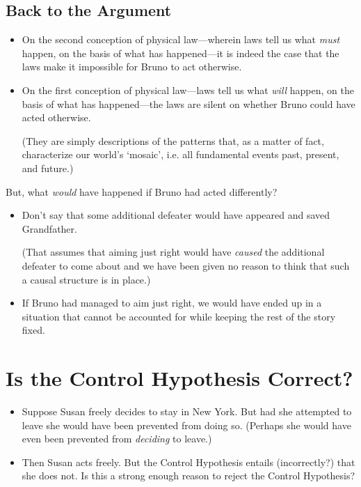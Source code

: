 \documentclass[12pt]{extarticle}
\begin{document}
\subsection{Back to the Argument}


\begin{itemize}


\item On the second conception of physical law---wherein laws tell us what \emph{must} happen, on the basis of what has happened---it is indeed the case that the laws make it impossible for Bruno to act otherwise. 

\item On the first conception of physical law---laws tell us what \emph{will} happen, on the basis of what has happened---the laws are silent on whether Bruno could have acted otherwise. 

(They are simply descriptions of the patterns that, as a matter of fact, characterize our world's `mosaic', i.e. all fundamental events past, present, and future.)

\end{itemize}
But, what \emph{would} have happened if Bruno had acted differently?


\begin{itemize}

\item Don't say that some additional defeater would have appeared and saved Grandfather. 

(That assumes that aiming just right would have \emph{caused} the additional defeater to come about and we have been given no reason to think that such a causal structure is in place.)

\item If Bruno had managed to aim just right, we would have ended up in a situation that cannot be accounted for while keeping the rest of the story fixed. 

\end{itemize}



\section{Is the Control Hypothesis Correct?}

\begin{itemize}
\item Suppose Susan freely decides to stay in New York. But had she attempted to leave she would have been prevented from doing so. (Perhaps she would have even been prevented from \emph{deciding} to leave.)

\item Then Susan acts freely. But the Control Hypothesis entails (incorrectly?) that she does not. Is this a strong enough reason to reject the Control Hypothesis? 

\end{itemize}
\end{document}
